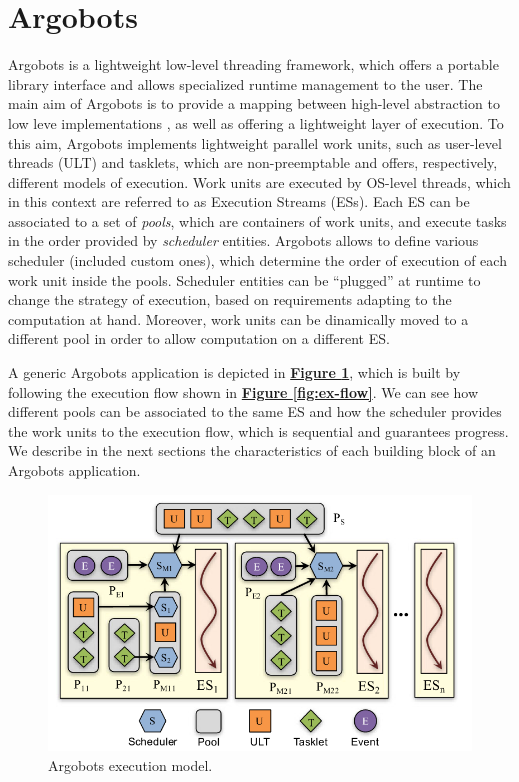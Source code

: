 \section{Argobots}
\label{sec:argobots}
Argobots \cite{argobots-paper, argobot} is a lightweight low-level threading framework, which offers a portable library interface and allows specialized runtime management to the user. The main aim of Argobots is to provide a mapping between high-level abstraction to low leve implementations \cite{argobots-paper}, as well as offering a lightweight layer of execution. To this aim, Argobots implements lightweight parallel work units, such as user-level threads (ULT) and tasklets, which are non-preemptable and offers, respectively, different models of execution. Work units are executed by OS-level threads, which in this context are referred to as Execution Streams (ESs). Each ES can be associated to a set of \textit{pools}, which are containers of work units, and execute tasks in the order provided by \textit{scheduler} entities. Argobots allows to define various scheduler (included custom ones), which determine the order of execution of each work unit inside the pools. Scheduler entities can be ``plugged'' at runtime to change the strategy of execution, based on requirements adapting to the computation at hand. Moreover, work units can be dinamically moved to a different pool in order to allow computation on a different ES.\newline

A generic Argobots application is depicted in \hyperref[fig:argobot-app]{\textbf{Figure \ref{fig:argobot-app}}}, which is built by following the execution flow shown in \hyperref[fig:ex-flow]{\textbf{Figure \ref{fig:ex-flow}}}. We can see how different pools can be associated to the same ES and how the scheduler provides the work units to the execution flow, which is sequential and guarantees progress. We describe in the next sections the characteristics of each building block of an Argobots application.

\begin{figure}[H]
    \centering
    \includegraphics[width=0.8\linewidth]{res/argobot_application.png}
    \caption{Argobots execution model.}
    \label{fig:argobot-app}
\end{figure}

